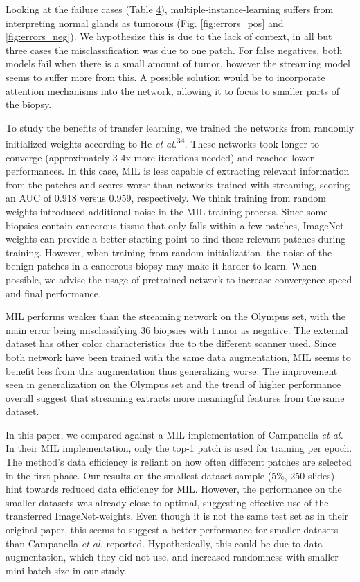 \documentclass[
  12pt,
  a5,margin=2cmpaper,
]{article}
\begin{document}
Looking at the failure cases (Table \protect\hyperlink{tab:errors}{4}),
multiple-instance-learning suffers from interpreting normal glands as
tumorous (Fig. \protect\hyperlink{fig:errors_pos}{{[}fig:errors\_pos{]}}
and \protect\hyperlink{fig:errors_neg}{{[}fig:errors\_neg{]}}). We
hypothesize this is due to the lack of context, in all but three cases
the misclassification was due to one patch. For false negatives, both
models fail when there is a small amount of tumor, however the streaming
model seems to suffer more from this. A possible solution would be to
incorporate attention mechanisms into the network, allowing it to focus
to smaller parts of the biopsy.

To study the benefits of transfer learning, we trained the networks from
randomly initialized weights according to He \emph{et
al.}\textsuperscript{34}. These networks took longer to converge
(approximately 3-4x more iterations needed) and reached lower
performances. In this case, MIL is less capable of extracting relevant
information from the patches and scores worse than networks trained with
streaming, scoring an AUC of 0.918 versus 0.959, respectively. We think
training from random weights introduced additional noise in the
MIL-training process. Since some biopsies contain cancerous tissue that
only falls within a few patches, ImageNet weights can provide a better
starting point to find these relevant patches during training. However,
when training from random initialization, the noise of the benign
patches in a cancerous biopsy may make it harder to learn. When
possible, we advise the usage of pretrained network to increase
convergence speed and final performance.

MIL performs weaker than the streaming network on the Olympus set, with
the main error being misclassifying 36 biopsies with tumor as negative.
The external dataset has other color characteristics due to the
different scanner used. Since both network have been trained with the
same data augmentation, MIL seems to benefit less from this augmentation
thus generalizing worse. The improvement seen in generalization on the
Olympus set and the trend of higher performance overall suggest that
streaming extracts more meaningful features from the same dataset.

In this paper, we compared against a MIL implementation of Campanella
\emph{et al.} In their MIL implementation, only the top-1 patch is used
for training per epoch. The method's data efficiency is reliant on how
often different patches are selected in the first phase. Our results on
the smallest dataset sample (5\%, 250 slides) hint towards reduced data
efficiency for MIL. However, the performance on the smaller datasets was
already close to optimal, suggesting effective use of the transferred
ImageNet-weights. Even though it is not the same test set as in their
original paper, this seems to suggest a better performance for smaller
datasets than Campanella \emph{et al.} reported. Hypothetically, this
could be due to data augmentation, which they did not use, and increased
randomness with smaller mini-batch size in our study.
\end{document}

